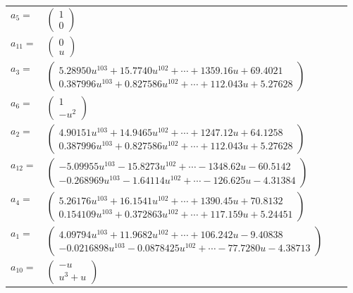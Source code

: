 \documentclass[1p]{elsarticle_modified}
\theoremstyle{definition}
\begin{document}
\begin{tabular}{m{7pt} m{180pt} m{7pt} m{180pt} }
\flushright $a_{5}=$&$\begin{pmatrix}1\\0\end{pmatrix}$ \\
\flushright $a_{11}=$&$\begin{pmatrix}0\\u\end{pmatrix}$ \\
\flushright $a_{3}=$&$\begin{pmatrix}5.28950 u^{103}+15.7740 u^{102}+\cdots+1359.16 u+69.4021\\0.387996 u^{103}+0.827586 u^{102}+\cdots+112.043 u+5.27628\end{pmatrix}$ \\
\flushright $a_{6}=$&$\begin{pmatrix}1\\- u^2\end{pmatrix}$ \\
\flushright $a_{2}=$&$\begin{pmatrix}4.90151 u^{103}+14.9465 u^{102}+\cdots+1247.12 u+64.1258\\0.387996 u^{103}+0.827586 u^{102}+\cdots+112.043 u+5.27628\end{pmatrix}$ \\
\flushright $a_{12}=$&$\begin{pmatrix}-5.09955 u^{103}-15.8273 u^{102}+\cdots-1348.62 u-60.5142\\-0.268969 u^{103}-1.64114 u^{102}+\cdots-126.625 u-4.31384\end{pmatrix}$ \\
\flushright $a_{4}=$&$\begin{pmatrix}5.26176 u^{103}+16.1541 u^{102}+\cdots+1390.45 u+70.8132\\0.154109 u^{103}+0.372863 u^{102}+\cdots+117.159 u+5.24451\end{pmatrix}$ \\
\flushright $a_{1}=$&$\begin{pmatrix}4.09794 u^{103}+11.9682 u^{102}+\cdots+106.242 u-9.40838\\-0.0216898 u^{103}-0.0878425 u^{102}+\cdots-77.7280 u-4.38713\end{pmatrix}$ \\
\flushright $a_{10}=$&$\begin{pmatrix}- u\\u^3+u\end{pmatrix}$ \\

\end{tabular}
\end{document}
